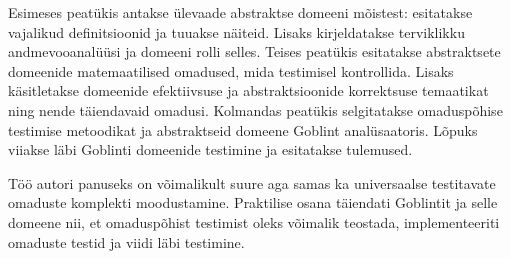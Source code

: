 \documentclass[../thesis.tex]{subfiles}
\begin{document}
Esimeses peatükis antakse ülevaade abstraktse domeeni mõistest: esitatakse vajalikud definitsioonid ja tuuakse näiteid. Lisaks kirjeldatakse terviklikku andmevooanalüüsi ja domeeni rolli selles.
Teises peatükis esitatakse abstraktsete domeenide matemaatilised omadused, mida testimisel kontrollida. Lisaks käsitletakse domeenide efektiivsuse ja abstraktsioonide korrektsuse temaatikat ning nende täiendavaid omadusi.
Kolmandas peatükis selgitatakse omaduspõhise testimise metoodikat ja abstraktseid domeene Goblint analüsaatoris. Lõpuks viiakse läbi Goblinti domeenide testimine ja esitatakse tulemused.

Töö autori panuseks on võimalikult suure aga samas ka universaalse testitavate omaduste komplekti moodustamine. Praktilise osana täiendati Goblintit ja selle domeene nii, et omaduspõhist testimist oleks võimalik teostada, implementeeriti omaduste testid ja viidi läbi testimine.
\end{document}

